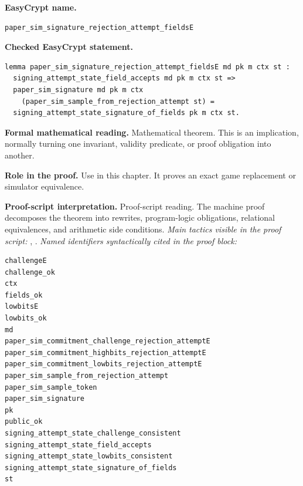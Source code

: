 \begin{formaltheorem}
\noindent\textbf{EasyCrypt name.}
\begin{lstlisting}[language=EasyCrypt,basicstyle=\ttfamily\scriptsize]
paper_sim_signature_rejection_attempt_fieldsE
\end{lstlisting}
\noindent\textbf{Checked EasyCrypt statement.}
\begin{lstlisting}[language=EasyCrypt,basicstyle=\ttfamily\scriptsize]
lemma paper_sim_signature_rejection_attempt_fieldsE md pk m ctx st :
  signing_attempt_state_field_accepts md pk m ctx st =>
  paper_sim_signature md pk m ctx
    (paper_sim_sample_from_rejection_attempt st) =
  signing_attempt_state_signature_of_fields pk m ctx st.
\end{lstlisting}
\noindent\textbf{Formal mathematical reading.}
Mathematical theorem. This is an implication, normally turning one invariant, validity predicate, or proof obligation into another.

\noindent\textbf{Role in the proof.}
Use in this chapter. It proves an exact game replacement or simulator equivalence.

\noindent\textbf{Proof-script interpretation.}
Proof-script reading. The machine proof decomposes the theorem into rewrites, program-logic obligations, relational equivalences, and arithmetic side conditions.
\emph{Main tactics visible in the proof script:} , .
\emph{Named identifiers syntactically cited in the proof block:}
\begin{lstlisting}[language=EasyCrypt,basicstyle=\ttfamily\scriptsize]
challengeE
challenge_ok
ctx
fields_ok
lowbitsE
lowbits_ok
md
paper_sim_commitment_challenge_rejection_attemptE
paper_sim_commitment_highbits_rejection_attemptE
paper_sim_commitment_lowbits_rejection_attemptE
paper_sim_sample_from_rejection_attempt
paper_sim_sample_token
paper_sim_signature
pk
public_ok
signing_attempt_state_challenge_consistent
signing_attempt_state_field_accepts
signing_attempt_state_lowbits_consistent
signing_attempt_state_signature_of_fields
st
\end{lstlisting}

\end{formaltheorem}

